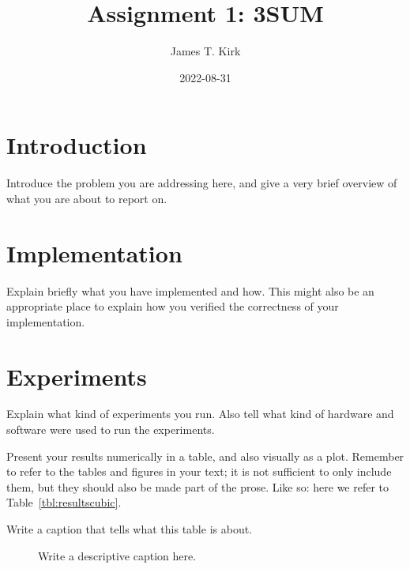 \documentclass[12pt, a4paper]{article}
\title{Assignment 1: 3SUM}
\author{James T. Kirk}
\date{2022-08-31}
\begin{document}
\maketitle

\section{Introduction}

Introduce the problem you are addressing here, and give a very brief
overview of what you are about to report on.

\section{Implementation}

Explain briefly what you have implemented and how. This might also be
an appropriate place to explain how you verified the correctness of
your implementation.

\section{Experiments}

Explain what kind of experiments you run. Also tell what kind of
hardware and software were used to run the experiments.

Present your results numerically in a table, and also visually as a
plot. Remember to refer to the tables and figures in your text; it is
not sufficient to only include them, but they should also be made part
of the prose. Like so: here we refer to Table~\ref{tbl:resultscubic}.

\begin{table}[h]
  \begin{center}
  \caption{Write a caption that tells what this table is about.}
  \label{tbl:resultscubic}
  \end{center}
\end{table}

\begin{figure}[h]
  \begin{center}
    \caption{Write a descriptive caption here.}
    \label{fig:runtimes}
  \end{center}
\end{figure}
\end{document}
